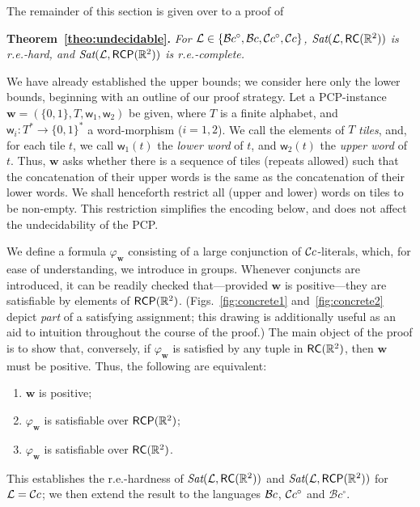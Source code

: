 \documentclass{article}
\newcommand{\Sat}{\textit{Sat}}
\newcommand{\cBci}{\ensuremath{\mathcal{B}c^\circ}}
\newcommand{\R}{\mathbb{R}}
\newcommand{\RC}{{\sf RC}}
\newcommand{\RCP}{{\sf RCP}}
\newcommand{\fw}{\mathsf{w}}
\newcommand{\fW}{\mathbf{w}}
\newcommand{\cL}{\mathcal{L}}
\newcommand{\set}[1]{\{#1\}}
\newenvironment{swetheorem}[1]{\par\medskip\noindent\textbf{#1.}\hspace*{0.5em}\em}{\par\smallskip}
\renewcommand{\phi}{\varphi}
\begin{document}
\bigskip

The remainder of this section is given over to a proof of
\begin{swetheorem}{Theorem~\ref{theo:undecidable}}
For $\mathcal{L}\in \{\cBci, \cBc, \cBCci, \cBCc\}$,
$\Sat(\mathcal{L},\RC(\R^2))$ is r.e.-hard, and
$\Sat(\mathcal{L},\RCP(\R^2))$ is r.e.-complete.
\end{swetheorem}

We have already established the upper bounds; we consider here only
the lower bounds, beginning with an outline of our proof strategy.
Let a PCP-instance $\fW = (\set{0,1}, T, \fw_1, \fw_2)$ be given,
where $T$ is a finite alphabet, and $\fw_i\colon T^* \rightarrow
\set{0,1}^*$ a word-morphism ($i = 1,2$).  We call the elements of $T$
    {\em tiles}, and, for each tile $t$, we call $\fw_1(t)$ the {\em
      lower word} of $t$, and $\fw_2(t)$ the {\em upper word} of
    $t$. Thus, $\fW$ asks whether there is a sequence of tiles
    (repeats allowed) such that the concatenation of their upper words
    is the same as the concatenation of their lower words. We shall
    henceforth restrict all (upper and lower) words on tiles to be
    non-empty.  This restriction simplifies the encoding below, and
    does not affect the undecidability of the PCP.

We define a formula $\phi_\fW$ consisting of a large conjunction of
$\mathcal{C}c$-literals, which, for ease of understanding, we introduce in
groups. Whenever conjuncts are introduced, it can be readily checked
that---provided $\fW$ is positive---they are satisfiable by elements
of $\RCP(\R^2)$. (Figs.~\ref{fig:concrete1} and~\ref{fig:concrete2}
depict {\em part} of a satisfying assignment; this drawing is
additionally useful as an aid to intuition throughout the course of
the proof.)  The main object of the proof is to show that, conversely,
if $\phi_\fW$ is satisfied by any tuple in $\RC(\R^2)$, then $\fW$
must be positive. Thus, the following are equivalent:
\begin{enumerate}
\item $\fW$ is positive;
\item $\phi_\fW$ is satisfiable over $\RCP(\R^2)$;
\item $\phi_\fW$ is satisfiable over $\RC(\R^2)$.
\end{enumerate}
This establishes the r.e.-hardness of $\Sat(\cL,\RC(\R^2))$ and
$\Sat(\cL,\RCP(\R^2))$ for $\cL = \cBCc$; we then extend the result to the
languages $\mathcal{B}c$, $\mathcal{C}c^\circ$ and $\cBci$.
\end{document}
